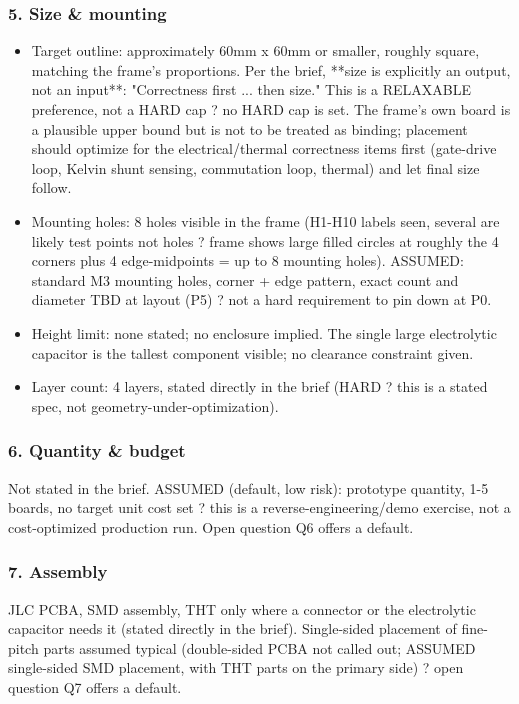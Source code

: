 \documentclass[11pt,a4paper]{article}
\begin{document}
\subsubsection*{5. Size \& mounting}
\begin{itemize}
\item Target outline: approximately 60mm x 60mm or smaller, roughly square,
matching the frame's proportions. Per the brief, {*}{*}size is explicitly an
output, not an input{*}{*}: "Correctness first ... then size." This is a
RELAXABLE preference, not a HARD cap ? no HARD cap is set. The frame's
own board is a plausible upper bound but is not to be treated as binding;
placement should optimize for the electrical/thermal correctness items
first (gate-drive loop, Kelvin shunt sensing, commutation loop, thermal)
and let final size follow.
\item Mounting holes: 8 holes visible in the frame (H1-H10 labels seen, several
are likely test points not holes ? frame shows large filled circles at
roughly the 4 corners plus 4 edge-midpoints = up to 8 mounting holes).
ASSUMED: standard M3 mounting holes, corner + edge pattern, exact count
and diameter TBD at layout (P5) ? not a hard requirement to pin down at
P0.
\item Height limit: none stated; no enclosure implied. The single large
electrolytic capacitor is the tallest component visible; no clearance
constraint given.
\item Layer count: 4 layers, stated directly in the brief (HARD ? this is a
stated spec, not geometry-under-optimization).
\end{itemize}
\subsubsection*{6. Quantity \& budget}
Not stated in the brief. ASSUMED (default, low risk): prototype quantity, 1-5 boards, no target unit cost set ? this is a reverse-engineering/demo exercise, not a cost-optimized production run. Open question Q6 offers a default.

\subsubsection*{7. Assembly}
JLC PCBA, SMD assembly, THT only where a connector or the electrolytic capacitor needs it (stated directly in the brief). Single-sided placement of fine-pitch parts assumed typical (double-sided PCBA not called out; ASSUMED single-sided SMD placement, with THT parts on the primary side) ? open question Q7 offers a default.
\end{document}
